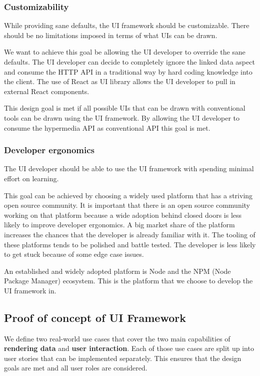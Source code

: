 \subsubsection{Customizability}
While providing sane defaults, the UI framework should be customizable. There should be no limitations imposed in terms of what UIs can be drawn.

We want to achieve this goal be allowing the UI developer to override the sane defaults. The UI developer can decide to completely ignore the linked data aspect and consume the HTTP API in a traditional way by hard coding knowledge into the client. The use of React as UI library allows the UI developer to pull in external React components.

This design goal is met if all possible UIs that can be drawn with conventional tools can be drawn using the UI framework. By allowing the UI developer to consume the hypermedia API as conventional API this goal is met.

\subsubsection{Developer ergonomics}
The UI developer should be able to use the UI framework with spending minimal effort on learning.

This goal can be achieved by choosing a widely used platform that has a striving open source community. It is important that there is an open source community working on that platform because a wide adoption behind closed doors is less likely to improve developer ergonomics.
A big market share of the platform increases the chances that the developer is already familiar with it. The tooling of these platforms tends to be polished and battle tested. The developer is less likely to get stuck because of some edge case issues.

An established and widely adopted platform is Node and the NPM (Node Package Manager) ecosystem. This is the platform that we choose to develop the UI framework in.

\subsection{Proof of concept of UI Framework}
We define two real-world use cases that cover the two main capabilities of \textbf{rendering data} and \textbf{user interaction}. Each of those use cases are split up into user stories that can be implemented separately. This ensures that the design goals are met and all user roles are considered.

